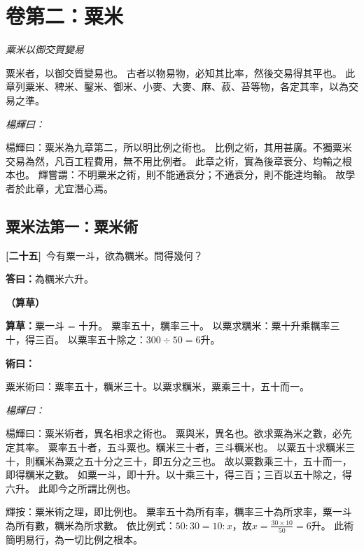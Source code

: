 \documentclass[11pt,a4paper]{article}
\newenvironment{method}{%
  \par\noindent\textcolor{methodcolor}{\textbf{術曰：}}%
  \ignorespaces
}{\par\vspace{0.5em}}
\newenvironment{caocao}{%
  \par\noindent\textcolor{caocaocolor}{\small\textbf{（算草）}}%
  \ignorespaces
}{\par\vspace{0.5em}}
\newenvironment{yanghuicomment}{%
  \par\noindent\textcolor{commentarycolor}{\small\textit{楊輝曰：}}%
  \ignorespaces
}{\par\vspace{0.5em}}
\newcommand{\problemnum}[1]{\textbf{[\ignorespaces#1\unskip]}}
\begin{document}
\newpage

\section{卷第二：粟米}
\label{sec:sumi}

\begin{center}
\textit{粟米以御交質變易}
\end{center}

粟米者，以御交質變易也。
古者以物易物，必知其比率，然後交易得其平也。
此章列粟米、稗米、鑿米、御米、小麥、大麥、麻、菽、苔等物，各定其率，以為交易之準。

\begin{yanghuicomment}
楊輝曰：粟米為九章第二，所以明比例之術也。
比例之術，其用甚廣。不獨粟米交易為然，凡百工程費用，無不用比例者。
此章之術，實為後章衰分、均輸之根本也。
輝嘗謂：不明粟米之術，則不能通衰分；不通衰分，則不能達均輸。
故學者於此章，尤宜潛心焉。
\end{yanghuicomment}

\subsection{粟米法第一：粟米術}

\noindent\problemnum{二十五}\,
今有粟一斗，欲為糲米。問得幾何？

\noindent\textcolor{answercolor}{\textbf{答曰：}}為糲米六升。

\begin{caocao}
\textbf{算草：}粟一斗 = 十升。
粟率五十，糲率三十。
以粟求糲米：粟十升乘糲率三十，得三百。
以粟率五十除之：$300 \div 50 = 6$升。
\end{caocao}

\begin{method}
粟米術曰：粟率五十，糲米三十。以粟求糲米，粟乘三十，五十而一。
\end{method}

\begin{yanghuicomment}
楊輝曰：粟米術者，異名相求之術也。
粟與米，異名也。欲求粟為米之數，必先定其率。
粟率五十者，五斗粟也。糲米三十者，三斗糲米也。
以粟五十求糲米三十，則糲米為粟之五十分之三十，即五分之三也。
故以粟數乘三十，五十而一，即得糲米之數。
如粟一斗，即十升。以十乘三十，得三百；三百以五十除之，得六升。
此即今之所謂比例也。

輝按：粟米術之理，即比例也。
粟率五十為所有率，糲率三十為所求率，粟一斗為所有數，糲米為所求數。
依比例式：$50 : 30 = 10 : x$，故$x = \frac{30 \times 10}{50} = 6$升。
此術簡明易行，為一切比例之根本。
\end{yanghuicomment}
\end{document}
